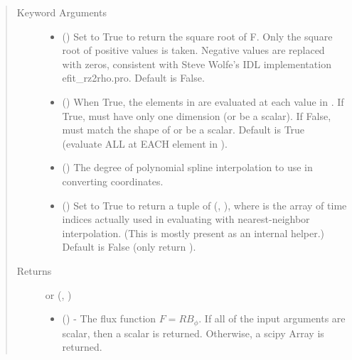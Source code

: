 \documentclass[letterpaper,10pt,english]{sphinxmanual}
\begin{document}
\begin{fulllineitems}
\begin{fulllineitems}
\begin{quote}
\begin{description}
\begin{itemize}
\end{itemize}

\item[{Keyword Arguments}] \leavevmode\begin{itemize}
\item {} 
 () \textendash{} Set to True to return the square root of F.
Only the square root of positive values is taken. Negative
values are replaced with zeros, consistent with Steve Wolfe’s
IDL implementation efit\_rz2rho.pro. Default is False.

\item {} 
 () \textendash{} When True, the elements in  are evaluated
at each value in . If True,  must have only one dimension
(or be a scalar). If False,  must match the shape of 
or be a scalar. Default is True (evaluate ALL  at EACH
element in ).

\item {} 
 () \textendash{} The degree of polynomial spline interpolation to
use in converting coordinates.

\item {} 
 () \textendash{} Set to True to return a tuple of (,
), where  is the array of time indices
actually used in evaluating  with nearest-neighbor
interpolation. (This is mostly present as an internal helper.)
Default is False (only return ).

\end{itemize}

\item[{Returns}] \leavevmode

 or (, )
\begin{itemize}
\item {} 
 () - The flux function \(F=RB_{\phi}\).
If all of the input arguments are scalar, then a scalar is returned.
Otherwise, a scipy Array is returned.


\end{itemize}
\end{description}
\end{quote}
\end{fulllineitems}
\end{fulllineitems}
\end{document}
